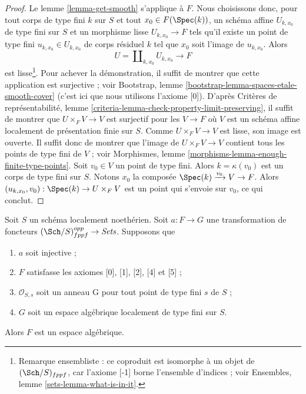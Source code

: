 \begin{proof}
Le lemme \ref{lemma-get-smooth} s'applique à $F$. Nous choisissons donc, pour
tout corps de type fini $k$ sur $S$ et tout $x_0 \in F(\Spec(k))$, un schéma
affine $U_{k, x_0}$ de type fini sur $S$ et un morphisme lisse
$U_{k, x_0} \to F$ tels qu'il existe un point de type fini
$u_{k, x_0} \in U_{k, x_0}$ de corps résiduel $k$ tel que $x_0$ soit l'image
de $u_{k, x_0}$.
Alors
$$
U = \coprod\nolimits_{k, x_0} U_{k, x_0} \longrightarrow F
$$
est lisse\footnote{Remarque ensembliste : ce coproduit est isomorphe à un
objet de $(\Sch/S)_{fppf}$, car l'axiome [-1] borne l'ensemble d'indices ;
voir Ensembles, lemme \ref{sets-lemma-what-is-in-it}.}. Pour achever la
démonstration, il suffit de montrer que cette application est surjective ;
voir Bootstrap, lemme \ref{bootstrap-lemma-spaces-etale-smooth-cover} (c'est
ici que nous utilisons l'axiome [0]). D'après Critères de représentabilité,
lemme \ref{criteria-lemma-check-property-limit-preserving}, il suffit de
montrer que $U \times_F V \to V$ est surjectif pour les $V \to F$ où $V$ est
un schéma affine localement de présentation finie sur $S$. Comme
$U \times_F V \to V$ est lisse, son image est ouverte. Il suffit donc de
montrer que l'image de $U \times_F V \to V$ contient tous les points de type
fini de $V$ ; voir Morphismes, lemme
\ref{morphisms-lemma-enough-finite-type-points}. Soit $v_0 \in V$ un point de
type fini. Alors $k = \kappa(v_0)$ est un corps de type fini sur $S$. Notons
$x_0$ la composée $\Spec(k) \xrightarrow{v_0} V \to F$. Alors
$(u_{k, x_0}, v_0) : \Spec(k) \to U \times_F V$ est un point qui s'envoie sur
$v_0$, ce qui conclut.
\end{proof}

\begin{lemma}
\label{lemma-monomorphism}
Soit $S$ un schéma localement noethérien. Soit $a : F \to G$ une
transformation de foncteurs $(\Sch/S)_{fppf}^{opp} \to \textit{Sets}$.
Supposons que
\begin{enumerate}
\item $a$ soit injective ;
\item $F$ satisfasse les axiomes [0], [1], [2], [4] et [5] ;
\item $\mathcal{O}_{S, s}$ soit un anneau G pour tout point de type fini $s$
de $S$ ;
\item $G$ soit un espace algébrique localement de type fini sur $S$.
\end{enumerate}
Alors $F$ est un espace algébrique.
\end{lemma}

